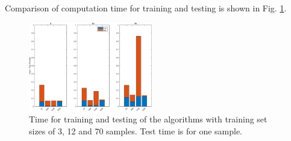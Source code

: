 \documentclass[journal]{IEEEtran}
\begin{document}
Comparison of computation time for training and testing is shown in Fig. \ref{f.runtimebarplot}.
\begin{figure}\label{f.runtimebarplot}
	\centering
	\includegraphics[width=0.48\textwidth]{images/runtimes}
	\caption{Time for training and testing of the algorithms with training set sizes of 3, 12 and 70 samples. Test time is for one sample.}
\end{figure}
\end{document}
